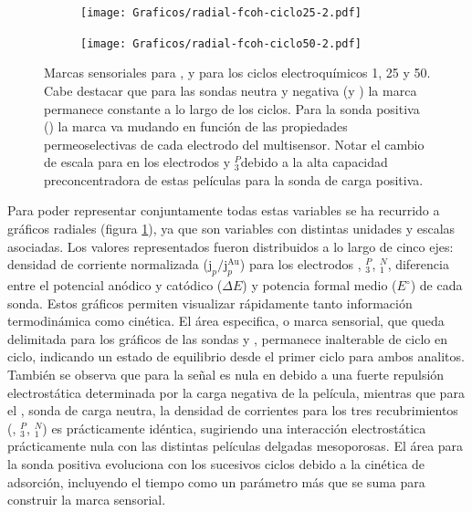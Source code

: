 \begin{figure}[b!]
\begin{subfigure}[t]{0.325\textwidth}
			     		\end{subfigure}
		     		\begin{subfigure}[t]{0.325\textwidth}
			        	\texttt{[image: Graficos/radial-fcoh-ciclo25-2.pdf]}
			     		\end{subfigure}
		     		\begin{subfigure}[t]{0.325\textwidth}
			        	\texttt{[image: Graficos/radial-fcoh-ciclo50-2.pdf]}
			     		\end{subfigure}	
			     	\caption{Marcas sensoriales para \ru, \fe\space y \fc\space para los ciclos electroquímicos 1, 25 y 50. Cabe destacar que para las sondas neutra y negativa (\fc\space y \fe) la marca permanece constante a lo largo de los ciclos. Para la sonda positiva (\ru) la marca va mudando en función de las propiedades permeoselectivas de cada electrodo del multisensor. Notar el cambio de escala para \ru\space en los electrodos \pdmZ\space y \pdmZ$^P_3$\space debido a la alta capacidad preconcentradora de estas películas para la sonda de carga positiva.} 
		     		\label{fig:radiales}
		      	   	\end{figure}
		
		 Para poder representar conjuntamente todas estas variables se ha recurrido a gráficos radiales (figura \ref{fig:radiales}), ya que son variables con distintas unidades y escalas asociadas. Los valores representados fueron distribuidos a lo largo de cinco ejes: densidad de corriente normalizada ($\text{j}_p/\text{j}_p^\text{Au}$) para los electrodos \pdmZ, \pdmZ$^P_3$, \pdmZ$^N_1$, diferencia entre el potencial anódico y catódico ($\Delta E$) y potencia formal medio ($E^{\circ}$) de cada sonda. Estos gráficos permiten visualizar rápidamente tanto información termodinámica como cinética. El área especifica, o marca sensorial, que queda delimitada para los gráficos de las sondas \fc\space y \fe, permanece inalterable de ciclo en ciclo, indicando un estado de equilibrio desde el primer ciclo para ambos analitos. También se observa que para \fe\space la señal es nula en \pdmZ\space debido a una fuerte repulsión electrostática determinada por la carga negativa de la película, mientras que para el \fc, sonda de carga neutra, la densidad de corrientes para los tres recubrimientos (\pdmZ, \pdmZ$^P_3$, \pdmZ$^N_1$) es prácticamente idéntica, sugiriendo una interacción electrostática prácticamente nula con las distintas películas delgadas mesoporosas. El área para la sonda positiva evoluciona con los sucesivos ciclos debido a la cinética de adsorción, incluyendo el tiempo como un parámetro más que se suma para construir la marca sensorial. 

